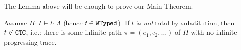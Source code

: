 The Lemma above will be enough to prove our Main Theorem.


\begin{theorem}
\label{theorem-main-finite-safe-reduction}
  Assume $\Pi:\Gamma\vdash t : A$ (hence $t\in {\tt WTyped}$).
  If $t$ is \emph{not} total by substitution, then $t \not \in {\tt GTC}$, i.e.:
  there is some infinite path $\pi = (e_1, e_2, \ldots)$ of $\Pi$ with no infinite progressing trace. 
\end{theorem}


%
%
